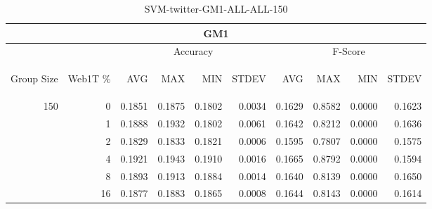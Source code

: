 \begin{center}
\begin{table}[htbp] 
 \begin{center}
\begin{tabular}{ | r | r | r | r | r | r | r | r | r | r |}
\hline
\multicolumn{10}{|c|}{GM1}\\
\hline
 & & \multicolumn{4}{|c|}{Accuracy} & \multicolumn{4}{|c|}{F-Score}\\ \cline{3-10}
\begin{sideways}Group Size\end{sideways} & \begin{sideways}Web1T \%\end{sideways} & \begin{sideways}AVG\end{sideways} & \begin{sideways}MAX\end{sideways} & \begin{sideways}MIN\end{sideways} & \begin{sideways}STDEV\end{sideways} & \begin{sideways}AVG\end{sideways} & \begin{sideways}MAX\end{sideways} & \begin{sideways}MIN\end{sideways} & \begin{sideways}STDEV\end{sideways}\\
\hline
\multirow{5}{*}{150}
 & 0 & 0.1851 & 0.1875 & 0.1802 & 0.0034 & 0.1629 & 0.8582 & 0.0000 & 0.1623\\ \cline{2-10}
 & 1 & 0.1888 & 0.1932 & 0.1802 & 0.0061 & 0.1642 & 0.8212 & 0.0000 & 0.1636\\ \cline{2-10}
 & 2 & 0.1829 & 0.1833 & 0.1821 & 0.0006 & 0.1595 & 0.7807 & 0.0000 & 0.1575\\ \cline{2-10}
 & 4 & 0.1921 & 0.1943 & 0.1910 & 0.0016 & 0.1665 & 0.8792 & 0.0000 & 0.1594\\ \cline{2-10}
 & 8 & 0.1893 & 0.1913 & 0.1884 & 0.0014 & 0.1640 & 0.8139 & 0.0000 & 0.1650\\ \cline{2-10}
 & 16 & 0.1877 & 0.1883 & 0.1865 & 0.0008 & 0.1644 & 0.8143 & 0.0000 & 0.1614\\ \cline{2-10}
\hline
\end{tabular}
\caption{SVM-twitter-GM1-ALL-ALL-150}
\label{table:SVM-twitter-GM1-ALL-ALL-150}
\end{center}
 \end{table}
\end{center}

